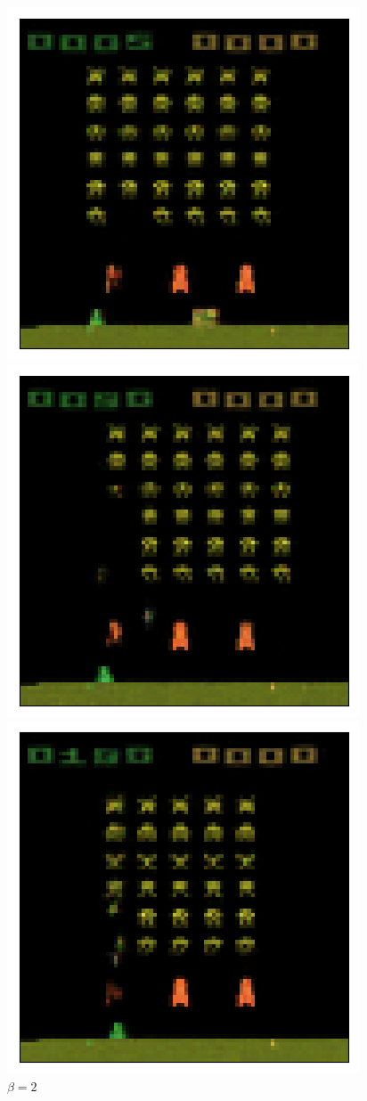 \begin{figure}[h!]
\begin{multicols}{4}
    \includegraphics[scale=0.4]{figures/results/colour_separated/beta_1_sample_3_reconstructed.png}
    \caption{$\beta = 1$}    
    \includegraphics[scale=0.4]{figures/results/colour_separated/beta_2_sample_3_reconstructed.png}
    \caption{$\beta = 2$}
    \includegraphics[scale=0.4]{figures/results/colour_separated/beta_4_sample_3_reconstructed.png}

\end{multicols}
\end{figure}
